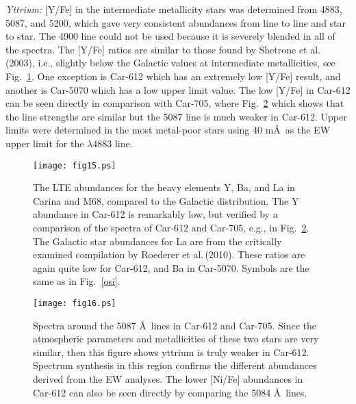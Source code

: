 \documentclass{emulateapj}
\newcommand\etal{{\rm et al.\,}}
\begin{document}
{\it Yttrium:}  
[Y/Fe] in the intermediate metallicity stars was determined from
 4883, 5087, and 5200, which gave very consistent abundances
from line to line and star to star.  
The  4900 line could not be used because it is severely 
blended in all of the spectra.  
The [Y/Fe] ratios are similar to those found by Shetrone \etal (2003), 
i.e., slightly below the Galactic values at intermediate metallicities,
see Fig.~\ref{ybala}.
One exception is Car-612 which has an extremely low [Y/Fe] result, and
another is Car-5070 which has a low upper limit value.
The low [Y/Fe] in Car-612 can be seen directly in 
comparison with Car-705, where Fig.~\ref{y2} which shows that the 
 line strengths are similar but the  5087 line 
is much weaker in Car-612.
%
Upper limits were determined in the most metal-poor stars
using 40 m\AA\ as the EW upper limit for the 
 $\lambda$4883 line.



\begin{figure}[t]
\texttt{[image: fig15.ps]}
\caption{The LTE abundances for the heavy 
elements Y, Ba, and La in Carina and M68, compared to the 
Galactic distribution. 
The Y abundance in Car-612 is remarkably low, but 
verified by a comparison of the spectra of Car-612 and
Car-705, e.g., in Fig.~\ref{y2}.
The Galactic star abundances for La are from the critically examined
compilation by Roederer \etal (2010).  
These ratios are again quite low for Car-612, and Ba in Car-5070.
%
Symbols are the same as in Fig.~\ref{osi}.
}
\label{ybala}
\end{figure}


\begin{figure}[h]
\texttt{[image: fig16.ps]}
\caption{
Spectra around the  5087 \AA\ lines in Car-612 and Car-705.  
Since the atmospheric parameters and metallicities of these two
stars are very similar, then this figure shows yttrium is truly weaker 
in Car-612.  Spectrum synthesis in this region confirms the different
 abundances derived from the EW analyses.  The lower [Ni/Fe]
abundances in Car-612 can also be seen directly by 
comparing the 5084 \AA\ lines. \\
}
\label{y2}
\end{figure}
\end{document}

